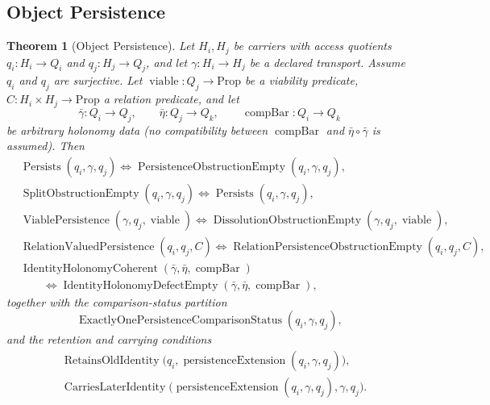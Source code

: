\documentclass[11pt]{article}
\newtheorem{theorem}{Theorem}[section]
\theoremstyle{definition}
\begin{document}
\subsection{Object Persistence}\label{sec:status-records-coherence:object-persistence}

\begin{theorem}[Object Persistence]\label{thm:F19}
Let \(H_i,H_j\) be carriers with access quotients
\(q_i:H_i\to Q_i\) and \(q_j:H_j\to Q_j\), and let
\(\gamma:H_i\to H_j\) be a declared transport.  Assume \(q_i\) and
\(q_j\) are surjective.  Let
\(\operatorname{viable}:Q_j\to\mathrm{Prop}\) be a viability
predicate, \(C:H_i\times H_j\to\mathrm{Prop}\) a relation predicate,
and let
\[
  \bar\gamma:Q_i\to Q_j,\qquad
  \bar\eta:Q_j\to Q_k,\qquad
  \operatorname{compBar}:Q_i\to Q_k
\]
be arbitrary holonomy data (no compatibility between
\(\operatorname{compBar}\) and \(\bar\eta\circ\bar\gamma\) is
assumed).  Then
\begin{align*}
  &\operatorname{Persists}(q_i,\gamma,q_j)
    \iff
    \operatorname{PersistenceObstructionEmpty}(q_i,\gamma,q_j),\\
  &\operatorname{SplitObstructionEmpty}(q_i,\gamma,q_j)
    \iff
    \operatorname{Persists}(q_i,\gamma,q_j),\\
  &\operatorname{ViablePersistence}(\gamma,q_j,\operatorname{viable})
    \iff
    \operatorname{DissolutionObstructionEmpty}
      (\gamma,q_j,\operatorname{viable}),\\
  &\operatorname{RelationValuedPersistence}(q_i,q_j,C)
    \iff
    \operatorname{RelationPersistenceObstructionEmpty}(q_i,q_j,C),\\
  &\operatorname{IdentityHolonomyCoherent}
      (\bar\gamma,\bar\eta,\operatorname{compBar})\\
  &\qquad{}\iff
    \operatorname{IdentityHolonomyDefectEmpty}
      (\bar\gamma,\bar\eta,\operatorname{compBar}),
\end{align*}
together with the comparison-status partition
\[
  \operatorname{ExactlyOnePersistenceComparisonStatus}
    (q_i,\gamma,q_j),
\]
and the retention and carrying conditions
\begin{align*}
  &\operatorname{RetainsOldIdentity}
      \bigl(q_i,\operatorname{persistenceExtension}(q_i,\gamma,q_j)\bigr),\\
  &\operatorname{CarriesLaterIdentity}
      \bigl(\operatorname{persistenceExtension}(q_i,\gamma,q_j),
        \gamma,q_j\bigr).
\end{align*}
\end{theorem}
\end{document}
